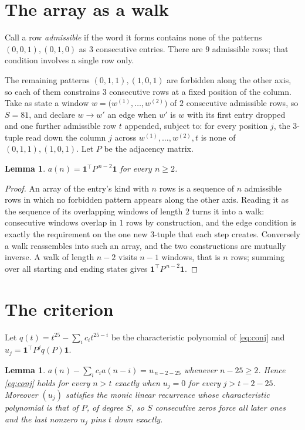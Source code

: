 \documentclass[11pt,a4paper]{article}
\theoremstyle{plain}
\newtheorem{lemma}[theorem]{Lemma}
\theoremstyle{definition}
\begin{document}
\section{The array as a walk}

Call a row \emph{admissible} if the word it forms contains none of the patterns
$(0,0,1), (0,1,0)$ as $3$ consecutive entries. There are $9$ admissible rows; that condition
involves a single row only.

The remaining patterns $(0,1,1), (1,0,1)$ are forbidden along the other axis, so each of them
constrains $3$ consecutive rows at a fixed position of the column. Take as state a
window $w=\bigl(w^{(1)},\dots,w^{(2)}\bigr)$ of $2$ consecutive admissible
rows, so $S=81$, and declare $w\to w'$ an edge when $w'$ is $w$ with its first entry
dropped and one further admissible row $t$ appended, subject to: for every position
$j$, the $3$-tuple read down the column $j$ across $w^{(1)},\dots,w^{(2)},t$
is none of $(0,1,1), (1,0,1)$. Let $P$ be the adjacency matrix.

\begin{lemma}\label{lem:walk}
$a(n)=\mathbf{1}^{\!\top}P^{\,n-2}\mathbf{1}$ for every $n\ge2$.
\end{lemma}

\begin{proof}
An array of the entry's kind with $n$ rows is a sequence of $n$ admissible rows in
which no forbidden pattern appears along the other axis. Reading it as the sequence of its
overlapping windows of length $2$ turns it into a walk: consecutive windows overlap in
$1$ rows by construction, and the edge condition is exactly the requirement on the one
new $3$-tuple that each step creates. Conversely a walk reassembles into such an array,
and the two constructions are mutually inverse. A walk of length $n-2$ visits $n-1$
windows, that is $n$ rows; summing over all starting and ending states gives
$\mathbf{1}^{\!\top}P^{\,n-2}\mathbf{1}$.
\end{proof}

\section{The criterion}

Let $q(t)=t^{25}-\sum_i c_i t^{25-i}$ be the characteristic polynomial of
\eqref{eq:conj} and $u_j=\mathbf{1}^{\!\top}P^{j}q(P)\mathbf{1}$.

\begin{lemma}\label{lem:crit}
$a(n)-\sum_i c_i a(n-i)=u_{\,n-2-25}$ whenever $n-25\ge2$. Hence
\eqref{eq:conj} holds for every $n>t$ exactly when $u_j=0$ for every
$j>t-2-25$. Moreover $(u_j)$ satisfies the monic linear recurrence whose
characteristic polynomial is that of $P$, of degree $S$, so $S$ consecutive zeros force all
later ones and the last nonzero $u_j$ pins $t$ down exactly.
\end{lemma}
\end{document}
